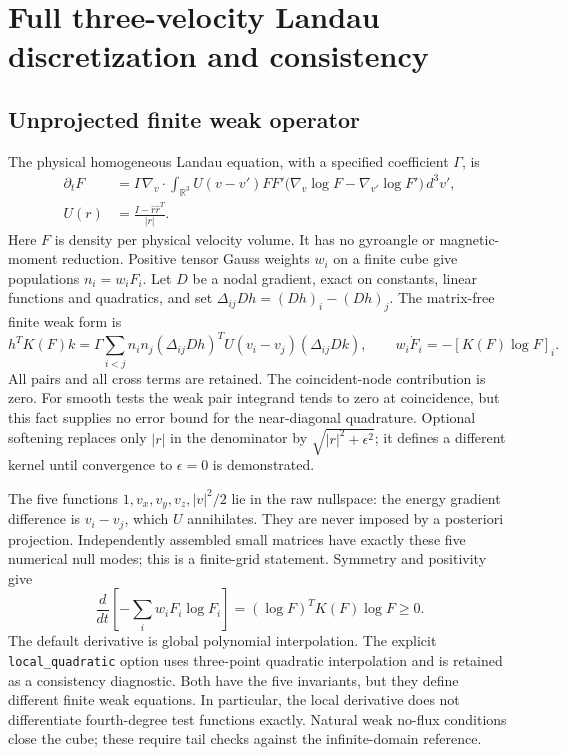 \documentclass[11pt,letterpaper]{article}
\begin{document}
\section{Full three-velocity Landau discretization and consistency}
\subsection{Unprojected finite weak operator}
The physical homogeneous Landau equation, with a specified coefficient
$\Gamma$, is
\begin{align}
 \partial_t F&=\Gamma\nabla_v\cdot\int_{\mathbb R^3}
 U(v-v')FF'\bigl(\nabla_v\log F-\nabla_{v'}\log F'\bigr)\,d^3v',\\
 U(r)&=\frac{I-\widehat r\widehat r^T}{|r|}.
\end{align}
Here $F$ is density per physical velocity volume. It has no gyroangle or
magnetic-moment reduction. Positive tensor Gauss weights $w_i$ on a
finite cube give populations $n_i=w_iF_i$. Let $D$ be a nodal gradient,
exact on constants, linear functions and quadratics, and set
$\Delta_{ij}Dh=(Dh)_i-(Dh)_j$. The matrix-free finite weak form is
\begin{equation}
 h^T K(F)k=\Gamma\sum_{i<j}n_in_j
 (\Delta_{ij}Dh)^TU(v_i-v_j)(\Delta_{ij}Dk),
 \qquad w_i\dot F_i=-[K(F)\log F]_i.
\end{equation}
All pairs and all cross terms are retained. The coincident-node
contribution is zero. For smooth tests the weak pair integrand tends to
zero at coincidence, but this fact supplies no error bound for the
near-diagonal quadrature. Optional softening replaces only $|r|$ in
the denominator by $\sqrt{|r|^2+\epsilon^2}$; it defines a different
kernel until convergence to $\epsilon=0$ is demonstrated.

The five functions $1,v_x,v_y,v_z,|v|^2/2$ lie in the raw nullspace:
the energy gradient difference is $v_i-v_j$, which $U$ annihilates.
They are never imposed by a posteriori projection. Independently
assembled small matrices have exactly these five numerical null modes;
this is a finite-grid statement. Symmetry and positivity give
\begin{equation}
 \frac{d}{dt}\left[-\sum_i w_iF_i\log F_i\right]
 = (\log F)^TK(F)\log F\geq0.
\end{equation}
The default derivative is global polynomial interpolation. The explicit
\texttt{local\_quadratic} option uses three-point quadratic interpolation
and is retained as a consistency diagnostic. Both have the five
invariants, but they define different finite weak equations. In
particular, the local derivative does not differentiate fourth-degree
test functions exactly. Natural weak no-flux conditions close the cube;
these require tail checks against the infinite-domain reference.
\end{document}
